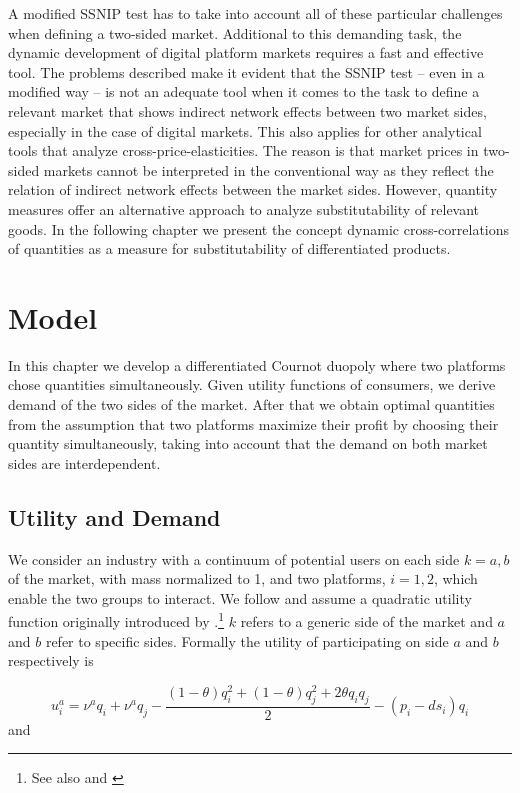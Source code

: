 \documentclass[10pt,a4paper]{scrreprt}
\begin{document}
A modified SSNIP test has to take into account all of these particular challenges when defining a two-sided market. Additional to this demanding task, the dynamic development of digital platform markets requires a fast and effective tool. The problems described make it evident that the SSNIP test – even in a modified way – is not an adequate tool when it comes to the task to define a relevant market that shows indirect network effects between two market sides, especially in the case of digital markets. This also applies for other analytical tools that analyze cross-price-elasticities. The reason is that market prices in two-sided markets cannot be interpreted in the conventional way as they reflect the relation of indirect network effects between the market sides. However, quantity measures offer an alternative approach to analyze substitutability of relevant goods. In the following chapter we present the concept dynamic cross-correlations of quantities as a measure for substitutability of differentiated products. 

\chapter{Model}\label{model}
In this chapter we develop a differentiated Cournot duopoly where two platforms chose quantities simultaneously.
Given utility functions of consumers, we derive demand of the two sides of the market. After that we obtain optimal quantities from the assumption that two platforms maximize their profit by choosing their quantity simultaneously, taking into account that the demand on both market sides are interdependent. 

\section{Utility and Demand}
We consider an industry with a continuum of potential users on each side $k = a,b$ of the market, with mass normalized to 1, and two platforms, $i = 1,2$, which enable the two groups to interact. We follow \cite{motta_competition_2004} and assume a quadratic utility function originally introduced by \cite{shubik_market_1980}.\footnote{See also \cite{dixit_model_1979} and \cite{kind_competition_2006}} $k$ refers to a generic side of the market and $a$ and $b$ refer to specific sides. Formally the utility of participating on side $a$ and $b$ respectively is 

\begin{equation}\label{4.1}
u_i^a = \nu^a q_i + \nu^a q_j-\frac{(1-\theta) q^2_i+ (1-\theta) q^2_j+ 2 \theta q_i q_j}{2}-(p_i-d s_i)q_i
\end{equation} and 
\end{document}

